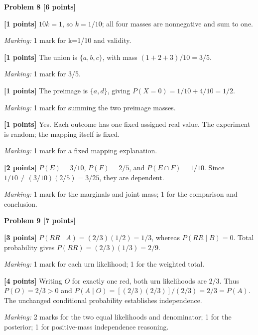 \documentclass[12pt,letterpaper]{article}
\newcommand{\problemheading}[2][5\baselineskip]{\Needspace{#1}\par\noindent\hspace*{-0.625in}\textbf{#2}\par\nobreak\vspace{0.3em}}
\begin{document}
\vspace{0.65em}
\problemheading[\dimexpr 3\baselineskip+4\baselineskip\relax]{Problem 8 [6 points]}
\begin{description}[font=\normalfont,leftmargin=1.2em,labelsep=0.4em]
\item[(a)] \textbf{[1 points]} $10k=1$, so $k=1/10$; all four masses are nonnegative and sum to one.
\par\textit{Marking:} 1 mark for k=1/10 and validity.
\item[(b)] \textbf{[1 points]} The union is $\{a,b,c\}$, with mass $(1+2+3)/10=3/5$.
\par\textit{Marking:} 1 mark for 3/5.
\item[(c)] \textbf{[1 points]} The preimage is $\{a,d\}$, giving $P(X=0)=1/10+4/10=1/2$.
\par\textit{Marking:} 1 mark for summing the two preimage masses.
\item[(d)] \textbf{[1 points]} Yes. Each outcome has one fixed assigned real value. The experiment is random; the mapping itself is fixed.
\par\textit{Marking:} 1 mark for a fixed mapping explanation.
\item[(e)] \textbf{[2 points]} $P(E)=3/10$, $P(F)=2/5$, and $P(E\cap F)=1/10$. Since $1/10\ne(3/10)(2/5)=3/25$, they are dependent.
\par\textit{Marking:} 1 mark for the marginals and joint mass; 1 for the comparison and conclusion.
\end{description}
\vspace{0.65em}
\problemheading[\dimexpr 3\baselineskip+4\baselineskip\relax]{Problem 9 [7 points]}
\begin{description}[font=\normalfont,leftmargin=1.2em,labelsep=0.4em]
\item[(a)] \textbf{[3 points]} $P(RR\mid A)=(2/3)(1/2)=1/3$, whereas $P(RR\mid B)=0$. Total probability gives $P(RR)=(2/3)(1/3)=2/9$.
\par\textit{Marking:} 1 mark for each urn likelihood; 1 for the weighted total.
\item[(b)] \textbf{[4 points]} Writing $O$ for exactly one red, both urn likelihoods are $2/3$. Thus $P(O)=2/3>0$ and $P(A\mid O)=[(2/3)(2/3)]/(2/3)=2/3=P(A)$. The unchanged conditional probability establishes independence.
\par\textit{Marking:} 2 marks for the two equal likelihoods and denominator; 1 for the posterior; 1 for positive-mass independence reasoning.
\end{description}
\end{document}
